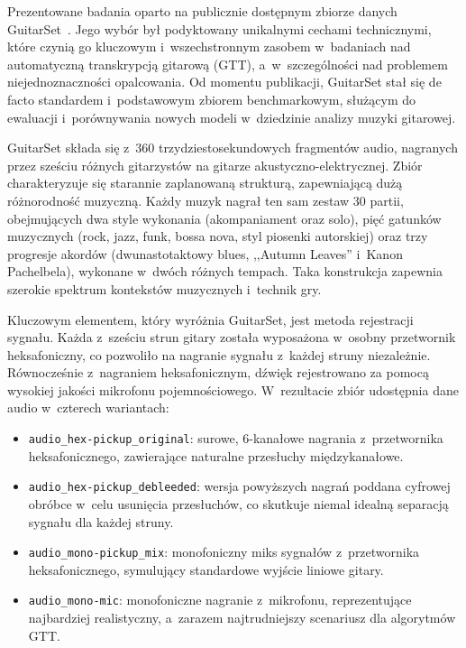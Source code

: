 Prezentowane badania oparto na publicznie dostępnym zbiorze danych GuitarSet~\autocite{Xi2018}. Jego wybór był podyktowany unikalnymi cechami technicznymi, które czynią go kluczowym i~wszechstronnym zasobem w~badaniach nad automatyczną transkrypcją gitarową (GTT), a~w~szczególności nad problemem niejednoznaczności opalcowania. Od momentu publikacji, GuitarSet stał się de facto standardem i~podstawowym zbiorem benchmarkowym, służącym do ewaluacji i~porównywania nowych modeli w~dziedzinie analizy muzyki gitarowej.

GuitarSet składa się z~360 trzydziestosekundowych fragmentów audio, nagranych przez sześciu różnych gitarzystów na gitarze akustyczno-elektrycznej. Zbiór charakteryzuje się starannie zaplanowaną strukturą, zapewniającą dużą różnorodność muzyczną. Każdy muzyk nagrał ten sam zestaw 30 partii, obejmujących dwa style wykonania (akompaniament oraz solo), pięć gatunków muzycznych (rock, jazz, funk, bossa nova, styl piosenki autorskiej) oraz trzy progresje akordów (dwunastotaktowy blues, ,,Autumn Leaves'' i~Kanon Pachelbela), wykonane w~dwóch różnych tempach. Taka konstrukcja zapewnia szerokie spektrum kontekstów muzycznych i~technik gry.

Kluczowym elementem, który wyróżnia GuitarSet, jest metoda rejestracji sygnału. Każda z~sześciu strun gitary została wyposażona w~osobny przetwornik heksafoniczny, co pozwoliło na nagranie sygnału z~każdej struny niezależnie. Równocześnie z~nagraniem heksafonicznym, dźwięk rejestrowano za pomocą wysokiej jakości mikrofonu pojemnościowego. W~rezultacie zbiór udostępnia dane audio w~czterech wariantach:
\begin{itemize}
    \item \texttt{audio\_hex-pickup\_original}: surowe, 6-kanałowe nagrania z~przetwornika heksafonicznego, zawierające naturalne przesłuchy międzykanałowe.
    \item \texttt{audio\_hex-pickup\_debleeded}: wersja powyższych nagrań poddana cyfrowej obróbce w~celu usunięcia przesłuchów, co skutkuje niemal idealną separacją sygnału dla każdej struny.
    \item \texttt{audio\_mono-pickup\_mix}: monofoniczny miks sygnałów z~przetwornika heksafonicznego, symulujący standardowe wyjście liniowe gitary.
    \item \texttt{audio\_mono-mic}: monofoniczne nagranie z~mikrofonu, reprezentujące najbardziej realistyczny, a~zarazem najtrudniejszy scenariusz dla algorytmów GTT.
\end{itemize}

